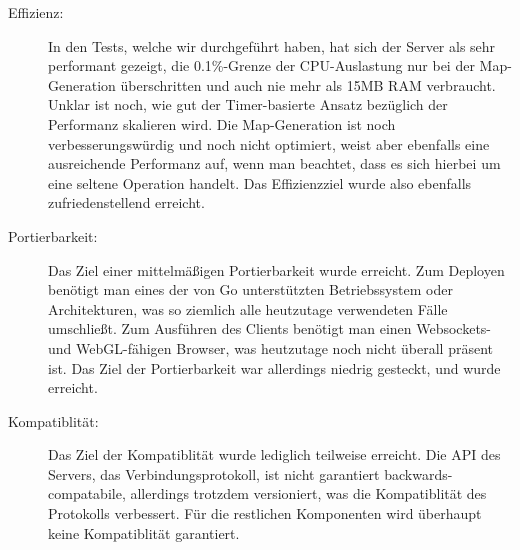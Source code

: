 \begin{description}
	\item[Effizienz:] In den Tests, welche wir durchgeführt haben, hat sich der Server als sehr performant gezeigt, die 0.1\%-Grenze der CPU-Auslastung nur bei der Map-Generation überschritten und auch nie mehr als 15MB RAM verbraucht. Unklar ist noch, wie gut der Timer-basierte Ansatz bezüglich der Performanz skalieren wird. Die Map-Generation ist noch verbesserungswürdig und noch nicht optimiert, weist aber ebenfalls eine ausreichende Performanz auf, wenn man beachtet, dass es sich hierbei um eine seltene Operation handelt. Das Effizienzziel wurde also ebenfalls zufriedenstellend erreicht.
	\item[Portierbarkeit:] Das Ziel einer mittelmäßigen Portierbarkeit wurde erreicht. Zum Deployen benötigt man eines der von Go unterstützten Betriebssystem oder Architekturen, was so ziemlich alle heutzutage verwendeten Fälle umschließt. Zum Ausführen des Clients benötigt man einen Websockets- und WebGL-fähigen Browser, was heutzutage noch nicht überall präsent ist. Das Ziel der Portierbarkeit war allerdings niedrig gesteckt, und wurde erreicht.
	\item[Kompatiblität:] Das Ziel der Kompatiblität wurde lediglich teilweise erreicht. Die API des Servers, das Verbindungsprotokoll, ist nicht garantiert backwards-compatabile, allerdings trotzdem versioniert, was die Kompatiblität des Protokolls verbessert. Für die restlichen Komponenten wird überhaupt keine Kompatiblität garantiert.
\end{description}